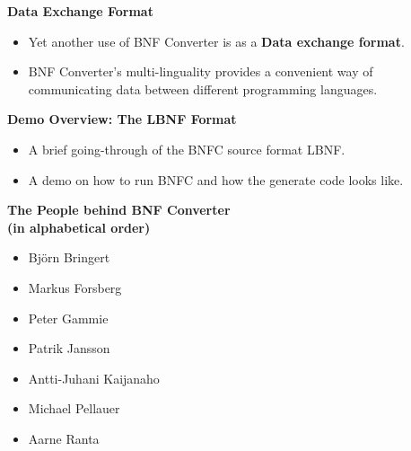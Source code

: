 \documentclass{seminar}
\newcommand{\slideheading}[1]{\begin{center}\large\bf{#1}\end{center}\bigskip}
\begin{document}
\begin{slide}
  \slideheading{Data Exchange Format}
  \begin{itemize}
  \item Yet another use of BNF Converter is as a \textbf{Data exchange
  format}. 
 \item BNF Converter's multi-linguality provides a convenient way
  of communicating data between different programming languages. 
  \end{itemize}
\end{slide}



\begin{slide}
  \slideheading{Demo Overview: The LBNF Format}
  \begin{itemize}
  \item A brief going-through of the BNFC source format LBNF.
  \item A demo on how to run BNFC and how the generate code looks like.
  \end{itemize}
\end{slide}

\begin{slide}
  \slideheading{The People behind BNF Converter \\ (in alphabetical order)}
  \begin{itemize}
  \item Bj{\"o}rn Bringert
  \item Markus Forsberg
  \item Peter Gammie
  \item Patrik Jansson
  \item Antti-Juhani Kaijanaho
  \item Michael Pellauer
  \item Aarne Ranta
  \end{itemize}
\end{slide}
\end{document}

